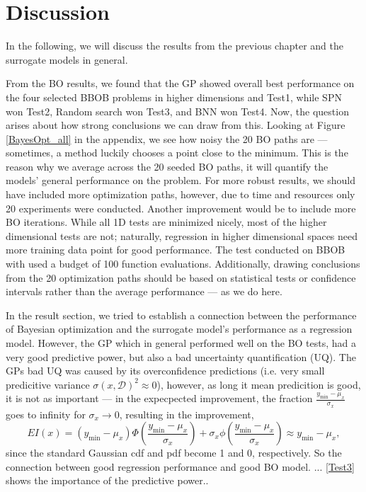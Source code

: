 \chapter{Discussion}
In the following, we will discuss the results from the previous chapter and the
surrogate models in general. 




From the BO results, we found that the GP showed overall best performance on the four selected BBOB
problems in higher dimensions and Test1, while SPN won Test2, Random search won Test3, and BNN won
Test4. Now, the question arises about how strong conclusions we can draw from this. Looking at
Figure \ref{BayesOpt_all} in the appendix, we see how noisy the 20 BO paths are --- sometimes, a
method luckily chooses a point close to the minimum. This is the reason why we average across the 20
seeded BO paths, it will quantify the models' general performance on the problem. For more robust
results, we should have included more optimization paths, however, due to time and resources only 20
experiments were conducted. Another improvement would be to include more BO iterations. While all
1D tests are minimized nicely, most of the higher dimensional tests are not; naturally, regression
in higher dimensional spaces need more training data point for good performance. The test conducted
on BBOB with \cite{PhDthesis} used a budget of 100 function evaluations. Additionally, drawing 
conclusions from the 20 optimization paths should be based on statistical tests or 
confidence intervals rather than the average performance --- as we do here. 

In the result section, we tried to establish a connection between the performance of Bayesian
optimization and the surrogate model's performance as a regression model. However, the GP which in
general performed well on the BO tests, had a very good predictive power, but also a bad uncertainty
quantification (UQ). The GPs bad UQ was caused by its overconfidence predictions (i.e. very
small predicitive variance $\sigma(x,\mathcal{D})^2 \approx 0$), however, as long it mean
predicition is good, it is not as important --- in the expecpected improvement, the fraction
$\frac{y_{\min}-\mu_x}{\sigma_x}$ goes to infinity for $\sigma_x \rightarrow 0$, resulting in the
improvement, 
$$EI(x) = (y_{\min}-\mu_x)\Phi\left(\frac{y_{\min}-\mu_x}{\sigma_x}\right)+ \sigma_x
\phi\left(\frac{y_{\min}-\mu_x}{\sigma_x}\right) \approx y_{\min}-\mu_x,$$ since the standard
Gaussian cdf and pdf become 1 and 0, respectively. So the connection between good regression performance
and good BO model. ...  \ref{Test3} shows the importance of the predictive power.. 

